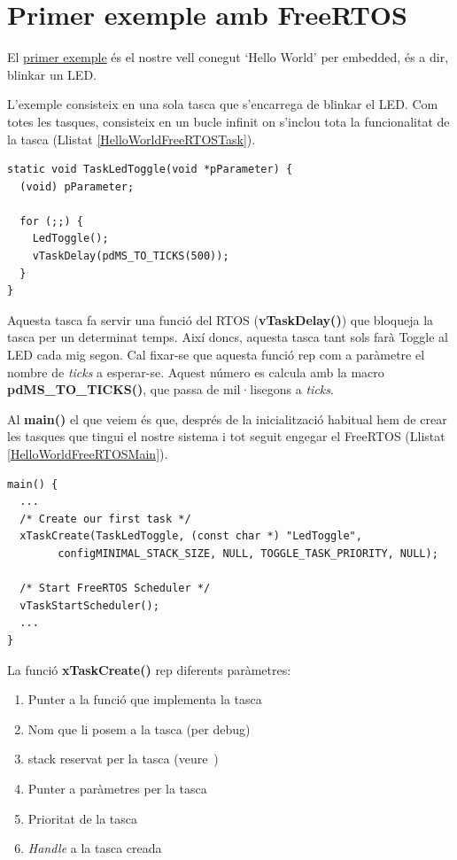 \chapter{Primer exemple amb FreeRTOS}
\label{sec:FreeRTOS_exemple_1}
El \href{https://github.com/mariusmm/cursembedded/tree/master/Simplicity/FreeRTOS_Blink}{primer exemple} és el nostre vell conegut ‘Hello World' per embedded, és a dir, blinkar un LED.

L'exemple consisteix en una sola tasca que s'encarrega de blinkar el LED. Com totes les tasques, consisteix en un bucle infinit on s'inclou tota la funcionalitat de la tasca (Llistat \ref{HelloWorldFreeRTOSTask}).

\begin{lstlisting}[caption={Tasca TaskLedToggle per FreeRTOS},style=customc,label=HelloWorldFreeRTOSTask]
static void TaskLedToggle(void *pParameter) {
  (void) pParameter;

  for (;;) {
    LedToggle();
    vTaskDelay(pdMS_TO_TICKS(500));
  }
}
\end{lstlisting}

Aquesta tasca fa servir una funció del RTOS ({\bf vTaskDelay()}) que bloqueja la tasca per un determinat temps. Així doncs, aquesta tasca tant sols farà Toggle al LED cada mig segon. Cal fixar-se que aquesta funció rep com a paràmetre el nombre de {\em ticks} a esperar-se. Aquest número es calcula amb la macro {\bf pdMS\_TO\_TICKS()}, que passa de mil·lisegons a {\em ticks}.

Al {\bf main()} el que veiem és que, després de la inicialització habitual hem de crear les tasques que tingui el nostre sistema i tot seguit engegar el FreeRTOS (Llistat \ref{HelloWorldFreeRTOSMain}).

\begin{lstlisting}[caption={Main HelloWorld per FreeRTOS},style=customc,label=HelloWorldFreeRTOSMain]
main() {
  ...
  /* Create our first task */
  xTaskCreate(TaskLedToggle, (const char *) "LedToggle",
        configMINIMAL_STACK_SIZE, NULL, TOGGLE_TASK_PRIORITY, NULL);

  /* Start FreeRTOS Scheduler */
  vTaskStartScheduler();
  ...
}
\end{lstlisting}

La funció {\bf xTaskCreate()} rep diferents paràmetres:
\begin{enumerate}
 \item Punter a la funció que implementa la tasca
 \item Nom que li posem a la tasca (per debug)
 \item \gls{stack} reservat per la tasca (veure~)
 \item Punter a paràmetres per la tasca
 \item Prioritat de la tasca
 \item {\em Handle} a la tasca creada
\end{enumerate}

